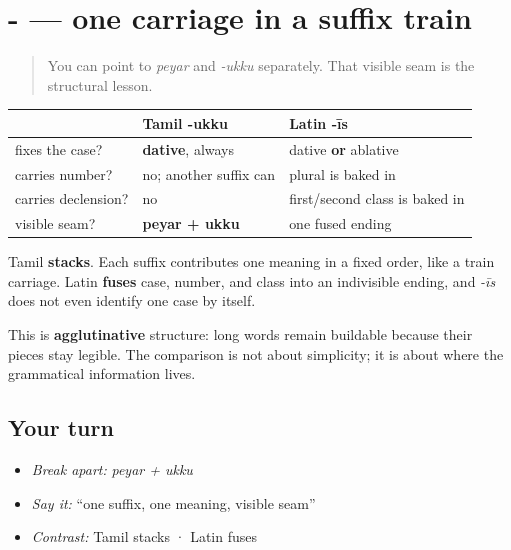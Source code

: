 \section[\texorpdfstring{\ta{பெயர்} + \ta{உக்கு} (peyar + ukku)}{பெயர் + உக்கு (peyar + ukku)}]{- — one carriage in a suffix train}

\label{lesson:TA-C06-dative-stacking}



\begin{quote}
You can point to \emph{peyar} and \emph{-ukku} separately. That visible seam is the structural lesson.
\end{quote}

\begin{grammarlens}[title={Grammar Lens: Stacking versus fusion}]
\noindent
\begin{tabularx}{\linewidth}{@{}>{\raggedright\arraybackslash}X>{\raggedright\arraybackslash}X>{\raggedright\arraybackslash}X@{}}
\toprule
\textbf{} & \textbf{Tamil \textbf{-ukku}} & \textbf{Latin \textbf{-īs}} \\
\midrule
fixes the case? & \textbf{dative}, always & dative \textbf{or} ablative \\
carries number? & no; another suffix can & plural is baked in \\
carries declension? & no & first/second class is baked in \\
visible seam? & \textbf{peyar + ukku} & one fused ending \\
\bottomrule
\end{tabularx}

Tamil \textbf{stacks}. Each suffix contributes one meaning in a fixed order, like a train carriage. Latin \textbf{fuses} case, number, and class into an indivisible ending, and \emph{-īs} does not even identify one case by itself.

This is \textbf{agglutinative} structure: long words remain buildable because their pieces stay legible. The comparison is not about simplicity; it is about where the grammatical information lives.
\end{grammarlens}

\subsection*{Your turn}
\begin{itemize}
\raggedright
  \item \emph{Break apart:} \emph{peyar + ukku}
  \item \emph{Say it:} \textquotedblleft{}one suffix, one meaning, visible seam\textquotedblright{}
  \item \emph{Contrast:} Tamil stacks · Latin fuses
\end{itemize}

